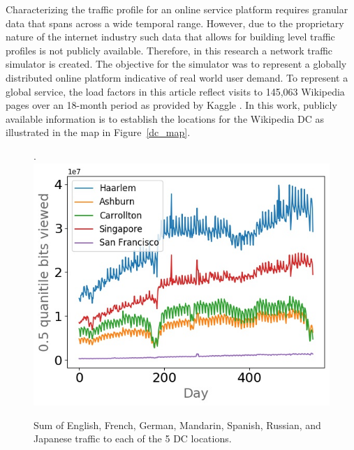  Characterizing the traffic profile for an online service platform requires granular data that spans across a wide temporal range. However, due to the proprietary nature of the internet industry such data that allows for building level traffic profiles is not publicly available. Therefore, in this research a network traffic simulator is created. The objective for the simulator was to represent a globally distributed online platform indicative of real world user demand. To represent a global service, the load factors in this article reflect visits to 145,063 Wikipedia pages over an 18-month period as provided by Kaggle \citep{kaggle17}. In this work, publicly available information is to establish the locations for the Wikipedia DC as illustrated in the map in Figure~\ref{dc_map}.

\begin{figure}.
\centering
\includegraphics[scale=0.45]{img/lang2dc_curve.jpg}
\caption{Sum of English, French, German, Mandarin, Spanish, Russian, and Japanese traffic to each of the 5 DC locations.}
\label{fig:lang2dc}
\end{figure}

